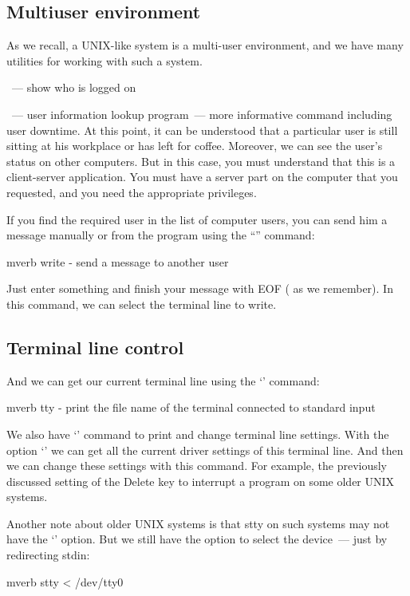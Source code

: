 \subsection*{Multiuser environment}

As we recall, a UNIX-like system is a multi-user environment,
and we have many utilities for working with such a system.

~--- show who is logged on

~--- user information lookup program~--- more informative
command including user downtime. At this point, it can be understood that
a particular user is still sitting at his workplace or has left for coffee.
Moreover, we can see the user's status on other computers. But in this case,
you must understand that this is a client-server application.
You must have a server part on the computer that you requested,
and you need the appropriate privileges.

If you find the required user in the list of computer users, you can send
him a message manually or from the program using the ``'' command:
\begin{code}{mverb}
write - send a message to another user
\end{code}
Just enter something and finish your message with EOF ( as we
remember). In this command, we can select the terminal line to write.

\subsection*{Terminal line control}

And we can get our current terminal line using the `' command:
\begin{code}{mverb}
tty - print the file name of the terminal connected
       to standard input
\end{code}

We also have `' command to print and change terminal line settings.
With the option `' we can get all the current driver settings of
this terminal line. And then we can change these settings with this command.
For example, the previously discussed setting of the Delete key
to interrupt a program on some older UNIX systems.

Another note about older UNIX systems is that stty on such systems may not
have the `' option. But we still have the option to select
the device~--- just by redirecting stdin:
\begin{code}{mverb}
stty < /dev/tty0
\end{code}
